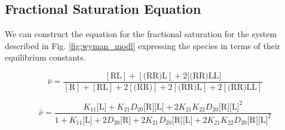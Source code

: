 \subsection{Fractional Saturation Equation}
We can construct the equation for the fractional saturation for the system described in Fig. \ref{fig:wyman_modl} expressing the species in terms of their equilibrium constants.

\begin{equation}
\bar{\nu}=\frac{[\text{RL}] + [\text{(RR)L}] + 2[\text{(RR)LL]}}{[\text{R}]+ [\text{RL}] + 2[\text{(RR)}] + 2[\text{(RR)L}] + 2[\text{(RR)LL}]}
\end{equation}

\begin{equation}
\bar{\nu}=\frac{K_{11}\text{[L]} + K_{21}D_{20}\text{[R][L]} + 2 K_{21} K_{22} D_{20}\text{[R]}\text{[L]}^2}{1 + K_{11}\text{[L]} + 2 D_{20}\text{[R]} + 2 K_{21} D_{20} \text{[R][L]} + 2 K_{21} K_{22} D_{20} \text{[R]}\text{[L]}^2}
\end{equation}


